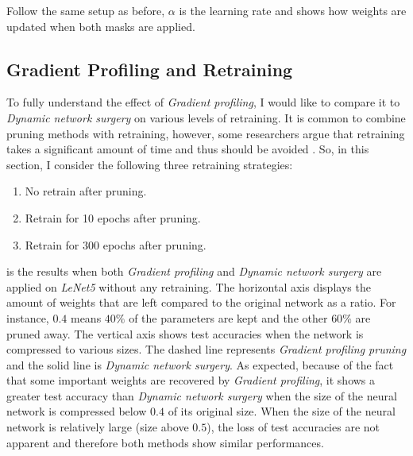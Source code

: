 \documentclass[a4paper,12pt]{report}
\begin{document}
Follow the same setup as before, $\alpha$ is the learning rate and 
shows how weights are updated when both masks are applied.



\subsection{Gradient Profiling and Retraining}
To fully understand the effect of \textit{Gradient profiling}, I would like to
compare it to \textit{Dynamic network surgery} on various levels of retraining.
It is common to combine pruning methods with retraining, however, some researchers
argue that retraining takes a significant amount of time and thus should be
avoided \cite{molchanov2016pruning}.
So, in this section, I consider the following three retraining strategies:
\begin{enumerate}
  \item No retrain after pruning.
  \item Retrain for 10 epochs after pruning.
  \item Retrain for 300 epochs after pruning.
\end{enumerate}

 is the results when both
\textit{Gradient profiling} and \textit{Dynamic network surgery} are
applied on \textit{LeNet5} without any retraining.
The horizontal axis displays the amount of weights that are left compared to the original
network as a ratio.
For instance, $0.4$ means $40\%$ of the parameters are kept and the other $60\%$
are pruned away.
The vertical axis shows test accuracies when the network is compressed to
various sizes.
The dashed line represents \textit{Gradient profiling pruning} and the solid
line is \textit{Dynamic network surgery}.
As expected, because of the fact that some important weights are recovered by
\textit{Gradient profiling}, it shows a greater test accuracy than \textit{Dynamic network surgery}
when the size of the neural network is compressed below $0.4$ of its original size.
When the size of the neural network is relatively large (size above $0.5$),
the loss of test accuracies are not apparent and therefore both methods show
similar performances.
\end{document}
